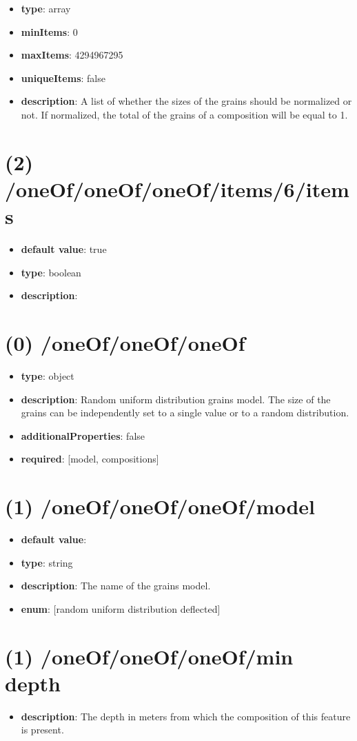 \begin{itemize}[leftmargin=1em]\item {\bf type}: array
\item {\bf minItems}: 0
\item {\bf maxItems}: 4294967295
\item {\bf uniqueItems}: false
\item {\bf description}: A list of whether the sizes of the grains should be normalized or not. If normalized, the total of the grains of a composition will be equal to 1.
\end{itemize}\section{(2) /oneOf/oneOf/oneOf/items/6/items}
\begin{itemize}[leftmargin=2em]\item {\bf default value}: true
\item {\bf type}: boolean
\item {\bf description}: 
\end{itemize}\section{(0) /oneOf/oneOf/oneOf}
\begin{itemize}[leftmargin=0em]\item {\bf type}: object
\item {\bf description}: Random uniform distribution grains model. The size of the grains can be independently set to a single value or to a random distribution.
\item {\bf additionalProperties}: false
\item {\bf required}: [model, compositions]\end{itemize}
\section{(1) /oneOf/oneOf/oneOf/model}
\begin{itemize}[leftmargin=1em]\item {\bf default value}: 
\item {\bf type}: string
\item {\bf description}: The name of the grains model.
\item {\bf enum}: [random uniform distribution deflected]\end{itemize}\section{(1) /oneOf/oneOf/oneOf/min depth}
\begin{itemize}[leftmargin=1em]\item {\bf description}: The depth in meters from which the composition of this feature is present.
\end{itemize}
